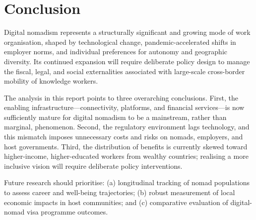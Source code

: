 \documentclass[12pt,a4paper]{article}
\begin{document}
\section{Conclusion}
\label{sec:conclusion}

Digital nomadism represents a structurally significant and growing mode of work
organisation, shaped by technological change, pandemic-accelerated shifts in
employer norms, and individual preferences for autonomy and geographic
diversity. Its continued expansion will require deliberate policy design to
manage the fiscal, legal, and social externalities associated with large-scale
cross-border mobility of knowledge workers.

The analysis in this report points to three overarching conclusions. First,
the enabling infrastructure—connectivity, platforms, and financial services—is
now sufficiently mature for digital nomadism to be a mainstream, rather than
marginal, phenomenon. Second, the regulatory environment lags technology, and
this mismatch imposes unnecessary costs and risks on nomads, employers, and
host governments. Third, the distribution of benefits is currently skewed
toward higher-income, higher-educated workers from wealthy countries; realising
a more inclusive vision will require deliberate policy interventions.

Future research should prioritise: (a) longitudinal tracking of nomad
populations to assess career and well-being trajectories; (b) robust
measurement of local economic impacts in host communities; and (c) comparative
evaluation of digital-nomad visa programme outcomes.
\end{document}
